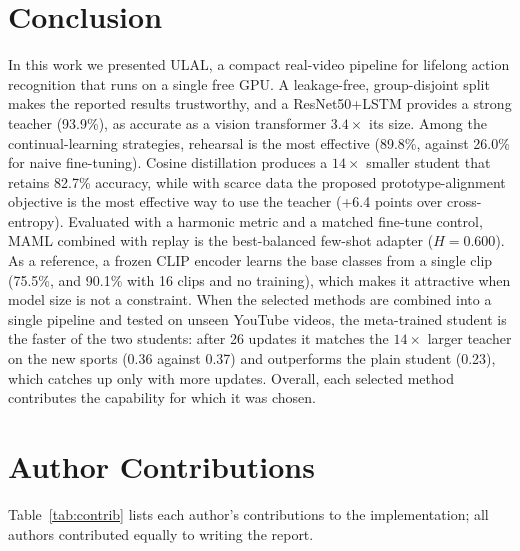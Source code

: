 \documentclass[conference]{IEEEtran}
\begin{document}
\section{Conclusion}
In this work we presented ULAL, a compact real-video pipeline for lifelong action recognition that runs on
a single free GPU. A leakage-free, group-disjoint split makes the reported results trustworthy, and a
ResNet50+LSTM provides a strong teacher (93.9\%), as accurate as a vision transformer $3.4\times$ its size.
Among the continual-learning strategies, rehearsal is the
most effective (89.8\%, against 26.0\% for naive fine-tuning). Cosine distillation produces a $14\times$
smaller student that retains 82.7\% accuracy, while with scarce data the proposed prototype-alignment
objective is the most effective way to use the teacher (+6.4 points over cross-entropy). Evaluated with a
harmonic metric and a matched fine-tune control, MAML combined with replay is the best-balanced few-shot
adapter ($H=0.600$). As a reference, a frozen CLIP encoder learns the base classes from a single clip
(75.5\%, and 90.1\% with 16 clips and no training), which makes it attractive when model size is not a
constraint. When the selected methods are combined into a single pipeline and tested on unseen YouTube
videos, the meta-trained student is the faster of the two students: after 26 updates it matches the
$14\times$ larger teacher on the new sports (0.36 against 0.37) and outperforms the plain student (0.23),
which catches up only with more updates. Overall, each selected method contributes the capability for which
it was chosen.

\section*{Author Contributions}
Table~\ref{tab:contrib} lists each author's contributions to the implementation; all authors contributed equally to writing the report.
\end{document}
